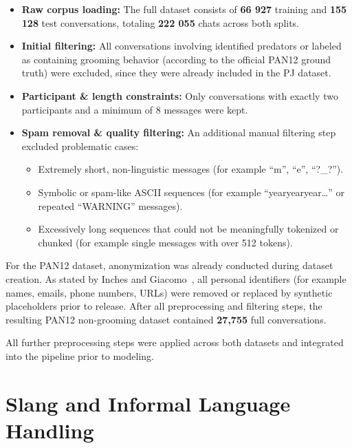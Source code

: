 \begin{itemize}
    \item \textbf{Raw corpus loading:} The full dataset consists of \textbf{66 927} training and \textbf{155 128} test conversations, totaling \textbf{222 055} chats across both splits.
    \item \textbf{Initial filtering:} All conversations involving identified predators or labeled as containing grooming behavior (according to the official PAN12 ground truth) were excluded, since they were already included in the PJ dataset.
    \item \textbf{Participant \& length constraints:} Only conversations with exactly two participants and a minimum of 8 messages were kept.
    \item \textbf{Spam removal \& quality filtering:} An additional manual filtering step excluded problematic cases:
    \begin{itemize}
        \item Extremely short, non-linguistic messages (for example \enquote{m}, \enquote{e}, \enquote{?\_?}).
        \item Symbolic or spam-like ASCII sequences (for example \enquote{yearyearyear\ldots} or repeated \enquote{WARNING} messages).
        \item Excessively long sequences that could not be meaningfully tokenized or chunked (for example single messages with over 512 tokens).
    \end{itemize}
\end{itemize}

For the PAN12 dataset, anonymization was already conducted during dataset creation. As stated by Inches and Giacomo~\cite{inches2012pan}, all personal identifiers (for example names, emails, phone numbers, URLs) were removed or replaced by synthetic placeholders prior to release. After all preprocessing and filtering steps, the resulting PAN12 non-grooming dataset contained \textbf{27,755} full conversations.

All further preprocessing steps were applied across both datasets and integrated into the pipeline prior to modeling.

\section{Slang and Informal Language Handling}

